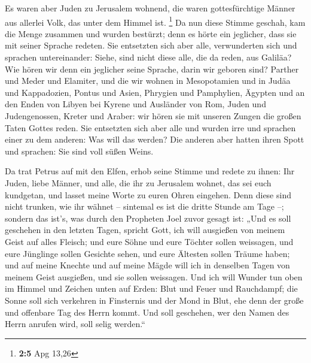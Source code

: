  Es waren aber Juden zu Jerusalem wohnend, die waren
gottesfürchtige Männer aus allerlei Volk, das unter dem Himmel ist.
\footnote{\textbf{2:5} Apg 13,26}  Da nun diese Stimme
geschah, kam die Menge zusammen und wurden bestürzt; denn es hörte ein
jeglicher, dass sie mit seiner Sprache redeten.  Sie
entsetzten sich aber alle, verwunderten sich und sprachen untereinander:
Siehe, sind nicht diese alle, die da reden, aus Galiläa? 
Wie hören wir denn ein jeglicher seine Sprache, darin wir geboren sind?
 Parther und Meder und Elamiter, und die wir wohnen in
Mesopotamien und in Judäa und Kappadozien, Pontus und Asien,
 Phrygien und Pamphylien, Ägypten und an den Enden von
Libyen bei Kyrene und Ausländer von Rom,  Juden und
Judengenossen, Kreter und Araber: wir hören sie mit unseren Zungen die
großen Taten Gottes reden.  Sie entsetzten sich aber alle
und wurden irre und sprachen einer zu dem anderen: Was will das werden?
 Die anderen aber hatten ihren Spott und sprachen: Sie
sind voll süßen Weins.

 Da trat Petrus auf mit den Elfen, erhob seine Stimme und
redete zu ihnen: Ihr Juden, liebe Männer, und alle, die ihr zu Jerusalem
wohnet, das sei euch kundgetan, und lasset meine Worte zu euren Ohren
eingehen.  Denn diese sind nicht trunken, wie ihr wähnet
-- sintemal es ist die dritte Stunde am Tage --;  sondern
das ist's, was durch den Propheten Joel zuvor gesagt ist:
 „Und es soll geschehen in den letzten Tagen, spricht
Gott, ich will ausgießen von meinem Geist auf alles Fleisch; und eure
Söhne und eure Töchter sollen weissagen, und eure Jünglinge sollen
Gesichte sehen, und eure Ältesten sollen Träume haben; 
und auf meine Knechte und auf meine Mägde will ich in denselben Tagen
von meinem Geist ausgießen, und sie sollen weissagen. 
Und ich will Wunder tun oben im Himmel und Zeichen unten auf Erden: Blut
und Feuer und Rauchdampf;  die Sonne soll sich verkehren
in Finsternis und der Mond in Blut, ehe denn der große und offenbare Tag
des Herrn kommt.  Und soll geschehen, wer den Namen des
Herrn anrufen wird, soll selig werden.``

